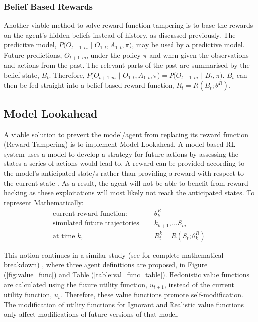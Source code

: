 \subsubsection{Belief Based Rewards}
Another viable method to solve reward function tampering is to base the rewards on the agent's hidden beliefs instead of history, as discussed previously.
The predicitve model, $P(O_{t+1:m}$ $|$ $O_{1:t}, A_{1:t}, \pi)$, may be used by a predictive model.
Future predictions, $O_{t+1:m}$, under the policy $\pi$ and when given the observations and actions from the past.
The relevant parts of the past are summarised by the belief state, $B_t$.
Therefore, $P(O_{t+1:m}$ $|$ $O_{1:t}, A_{1:t}, \pi) = P(O_{t+1:m}$ $|$ $B_t, \pi)$.
$B_t$ can then be fed straight into a belief based reward function, $R_t = R(B_t;\theta^R)$.

\subsection{Model Lookahead}
A viable solution to prevent the model/agent from replacing its reward function (Reward Tampering) is to implement Model Lookahead.
A model based RL system uses a model to develop a strategy for future actions by assessing the states a series of actions would lead to.
A reward can be provided according to the model's anticipated state/s rather than providing a reward with respect to the current state \cite{Amodei}.
As a result, the agent will not be able to benefit from reward hacking as these exploitations will most likely not reach the anticipated states.
To represent Mathematically:
\begin{align*}
    \text{current reward function: } &\quad\theta^R_k \\
    \text{simulated future trajectories } &\quad  k_{k+1},... S_m  \\
    \text{at time } k, &\quad  R_t^k = R(S_t;\theta^R_k)
\end{align*}
    
This notion continues in a similar study (see for complete mathematical breakdown) \cite{EverittFDH16}, 
where three agent definitions are proposed, in Figure (\ref{fig:value_func}) and Table (\ref{table:val_func_table}).
Hedonistic value functions are calculated using the future utility function, $u_{t+1}$, instead of the current utility function, $u_t$.
Therefore, these value functions promote self-modification.
The modification of utility functions for Ignorant and Realistic value functions only affect modifications of future versions of that model.

